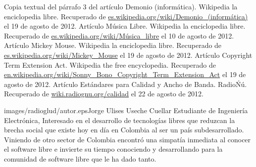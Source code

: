 \begin{multicols}{2}

\begin{bibliografia}
Copia textual del párrafo 3 del artículo Demonio (informática). Wikipedia la enciclopedia libre.
Recuperado de \url{es.wikipedia.org/wiki/Demonio_(informática)} el 19 de agosto de 2012.
Artículo Música Libre. Wikipedia la enciclopedia libre.
Recuperado de \url{es.wikipedia.org/wiki/Música_libre} el 10 de agosto de 2012.
Artículo Mickey Mouse. Wikipedia la enciclopedia libre.
Recuperado de \url{es.wikipedia.org/wiki/Mickey_Mouse} el 19 de agosto de 2012.
Artículo Copyright Term Extension Act. Wikipedia the free encyclopedia.
Recuperado de \url{en.wikipedia.org/wiki/Sonny_Bono_Copyright_Term_Extension_Act} el 19 de agosto de 2012.
Artículo Estándares para Calidad y Ancho de Banda. RadioŃú.
Recuperado de \url{wiki.radiognu.org/calidad} el 22 de agosto de 2012.
\end{bibliografia}


\begin{biografia}{images/radioglud/autor.eps}{Jorge Ulises Useche Cuellar} Estudiante de Ingeniería Electrónica, Interesado en el desarrollo de tecnologías libres que reduzcan la brecha social que existe hoy en día en Colombia al ser un país subdesarrollado. Viniendo de otro sector de Colombia encontró una simpatía inmediata al conocer el software libre e invierte su tiempo conociendo y desarrollando para la comunidad de software libre que le ha dado tanto.
\end{biografia}

\raggedcolumns
\pagebreak


\end{multicols}

\clearpage
\pagebreak
